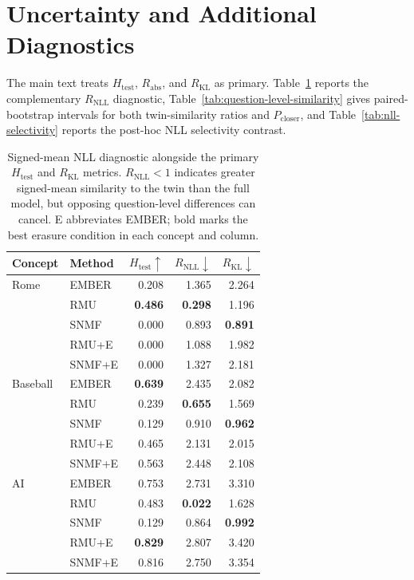 \section{Uncertainty and Additional Diagnostics}
\label{app:diagnostics}
\raggedbottom

The main text treats $H_{\mathrm{test}}$, $R_{\mathrm{abs}}$, and
$R_{\mathrm{KL}}$ as primary. Table~\ref{tab:metric-agreement} reports the
complementary $R_{\mathrm{NLL}}$ diagnostic,
Table~\ref{tab:question-level-similarity} gives paired-bootstrap intervals for
both twin-similarity ratios and $P_{\mathrm{closer}}$, and
Table~\ref{tab:nll-selectivity} reports the post-hoc NLL selectivity contrast.

\begin{table}[t]
  \centering
  \small
  \begin{tabular}{llrrr}
    \toprule
    Concept & Method & $H_{\mathrm{test}}\uparrow$ & $R_{\mathrm{NLL}}\downarrow$ & $R_{\mathrm{KL}}\downarrow$ \\
    \midrule
    Rome & EMBER & 0.208 & 1.365 & 2.264 \\
         & RMU   & \textbf{0.486} & \textbf{0.298} & 1.196 \\
         & SNMF  & 0.000 & 0.893 & \textbf{0.891} \\
         & RMU+E & 0.000 & 1.088 & 1.982 \\
         & SNMF+E & 0.000 & 1.327 & 2.181 \\
    \midrule
    Baseball & EMBER & \textbf{0.639} & 2.435 & 2.082 \\
             & RMU   & 0.239 & \textbf{0.655} & 1.569 \\
             & SNMF  & 0.129 & 0.910 & \textbf{0.962} \\
             & RMU+E & 0.465 & 2.131 & 2.015 \\
             & SNMF+E & 0.563 & 2.448 & 2.108 \\
    \midrule
    AI & EMBER & 0.753 & 2.731 & 3.310 \\
       & RMU   & 0.483 & \textbf{0.022} & 1.628 \\
       & SNMF  & 0.129 & 0.864 & \textbf{0.992} \\
       & RMU+E & \textbf{0.829} & 2.807 & 3.420 \\
       & SNMF+E & 0.816 & 2.750 & 3.354 \\
    \bottomrule
  \end{tabular}
  \caption{Signed-mean NLL diagnostic alongside the primary
  $H_{\mathrm{test}}$ and $R_{\mathrm{KL}}$ metrics. $R_{\mathrm{NLL}}<1$
  indicates greater signed-mean similarity to the twin than the full model,
  but opposing question-level differences can cancel. E abbreviates EMBER;
  bold marks the best erasure condition in each concept and column.}
  \label{tab:metric-agreement}
\end{table}

